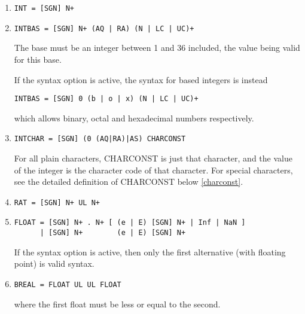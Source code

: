 \begin{enumerate}

\item{}
\begin{verbatim}
INT = [SGN] N+
\end{verbatim}

\item{}
\begin{verbatim}
INTBAS = [SGN] N+ (AQ | RA) (N | LC | UC)+
\end{verbatim}
The base must be an integer between 1 and 36 included, the value
being valid for this base.

If the syntax option  is active, the syntax for
based
integers is instead
\begin{verbatim}
INTBAS = [SGN] 0 (b | o | x) (N | LC | UC)+
\end{verbatim}
which allows binary, octal and hexadecimal numbers respectively.

\item{}
\label{intchar}
\begin{verbatim}
INTCHAR = [SGN] (0 (AQ|RA)|AS) CHARCONST
\end{verbatim}
For all plain characters, CHARCONST is just that character, and the
value of the integer is the character code of that character.
For special characters, see the detailed definition
of CHARCONST below \ref{charconst}.

\item{}
\begin{verbatim}
RAT = [SGN] N+ UL N+
\end{verbatim}

\item{}
\begin{verbatim}
FLOAT = [SGN] N+ . N+ [ (e | E) [SGN] N+ | Inf | NaN ]
      | [SGN] N+        (e | E) [SGN] N+
\end{verbatim}
If the syntax option  is active, then
only the first alternative (with floating point) is valid syntax.

\item{}
\begin{verbatim}
BREAL = FLOAT UL UL FLOAT
\end{verbatim}
where the first float must be less or equal to the second.

\end{enumerate}

